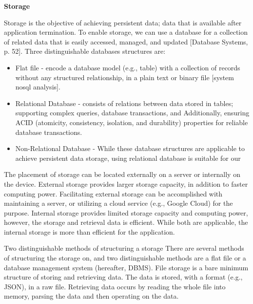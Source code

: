 \noindent \textbf{Storage}

\noindent Storage is the objective of achieving persistent data; data that is available after application termination.  To enable storage, we can use a database for a collection of related data that is easily accessed, managed, and updated [Database Systems, p. 52]. Three distinguishable databases structures are:
\begin{itemize}
    \item Flat file - encode a database model (e.g., table) with a collection of records without any structured relationship, in a plain text or binary file [system nosql analysis]. 
    \item Relational Database - consists of relations between data stored in tables; supporting complex queries, database transactions, and   Additionally, ensuring ACID (atomicity, consistency, isolation, and durability) properties for reliable database transactions. 
    \item Non-Relational Database - While these database structures are applicable to achieve persistent data storage, using relational database is suitable for our 
\end{itemize}



The placement of storage can be located externally on a server or internally on the device. External storage provides larger storage capacity, in addition to faster computing power. Facilitating external storage can be accomplished with maintaining a server, or utilizing a cloud service (e.g., Google Cloud) for the purpose. Internal storage provides limited storage capacity and computing power, however, the storage and retrieval data is efficient.  While both are applicable, the internal storage is more than efficient for the application.

Two distinguishable methods of structuring a storage 
There are several methods of structuring the storage on, and two distinguishable methods are a flat file or a database management system (hereafter, DBMS). File storage is a bare minimum structure of storing and retrieving data. The data is stored, with a format (e.g., JSON), in a raw file. Retrieving data occurs by reading the whole file into memory, parsing the data and then operating on the data.